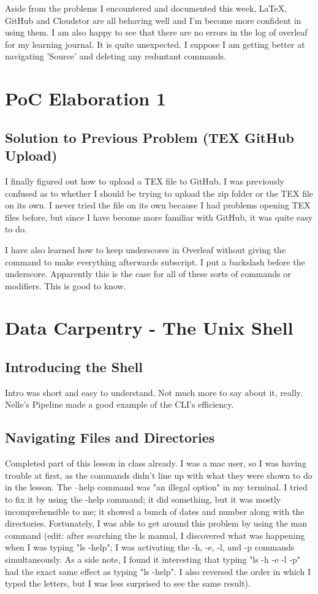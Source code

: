\documentclass{article}
\begin{document}
Aside from the problems I encountered and documented this week, LaTeX, GitHub and Cloudstor are all behaving well and I’m become more confident in using them. I am also happy to see that there are no errors in the log of overleaf for my learning journal. It is quite unexpected. I suppose I am getting better at navigating 'Source' and deleting any reduntant commands.

\date{23rd-29th August 2019}
\section{PoC Elaboration 1}
\subsection{Solution to Previous Problem (TEX GitHub Upload)}
I finally figured out how to upload a TEX file to GitHub. I was previously confused as to whether I should be trying to upload the zip folder or the TEX file on its own. I never tried the file on its own because I had problems opening TEX files before, but since I have become more familiar with GitHub, it was quite easy to do.

I have also learned how to keep underscores in Overleaf without giving the command to make everything afterwards subscript. I put a backslash before the underscore. Apparently this is the case for all of these sorts of commands or modifiers. This is good to know.

\section{Data Carpentry - The Unix Shell}
\subsection{Introducing the Shell}
Intro was short and easy to understand. Not much more to say about it, really. Nelle's Pipeline made a good example of the CLI's efficiency.

\subsection{Navigating Files and Directories}
Completed part of this lesson in class already. I was a mac user, so I was having trouble at first, as the commands didn't line up with what they were shown to do in the lesson. The --help command was "an illegal option" in my terminal. I tried to fix it by using the -help command; it did something, but it was mostly incomprehensible to me; it showed a bunch of dates and number along with the directories. Fortunately, I was able to get around this problem by using the man command (edit: after searching the ls manual, I discovered what was happening when I was typing "ls -help"; I was activating the -h, -e, -l, and -p commands simultaneously. As a side note, I found it interesting that typing "ls -h -e -l -p" had the exact same effect as typing "ls -help". I also reversed the order in which I typed the letters, but I was less surprised to see the same result).
\end{document}
